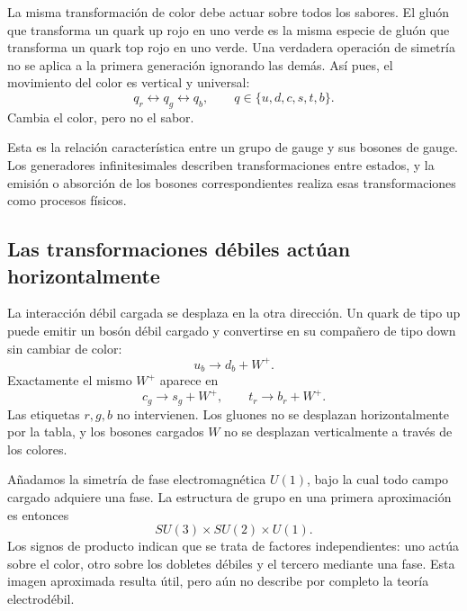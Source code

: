 La misma transformación de color debe actuar sobre todos los sabores. El gluón que transforma un quark up rojo en uno verde es la misma especie de gluón que transforma un quark top rojo en uno verde. Una verdadera operación de simetría no se aplica a la primera generación ignorando las demás. Así pues, el movimiento del color es vertical y universal:
\begin{equation}
  q_r\longleftrightarrow q_g\longleftrightarrow q_b,
  \qquad q\in\{u,d,c,s,t,b\}.
\end{equation}
Cambia el color, pero no el sabor.

Esta es la relación característica entre un grupo de gauge y sus bosones de gauge. Los generadores infinitesimales describen transformaciones entre estados, y la emisión o absorción de los bosones correspondientes realiza esas transformaciones como procesos físicos.

\subsection{Las transformaciones débiles actúan horizontalmente}

La interacción débil cargada se desplaza en la otra dirección. Un quark de tipo up puede emitir un bosón débil cargado y convertirse en su compañero de tipo down sin cambiar de color:
\begin{equation}
  u_b\longrightarrow d_b+W^+.
\end{equation}
Exactamente el mismo \(W^+\) aparece en
\begin{equation}
  c_g\longrightarrow s_g+W^+,
  \qquad
  t_r\longrightarrow b_r+W^+.
\end{equation}
Las etiquetas \(r,g,b\) no intervienen. Los gluones no se desplazan horizontalmente por la tabla, y los bosones cargados \(W\) no se desplazan verticalmente a través de los colores.

Añadamos la simetría de fase electromagnética \(U(1)\), bajo la cual todo campo cargado adquiere una fase. La estructura de grupo en una primera aproximación es entonces
\begin{equation}
  SU(3)\times SU(2)\times U(1).
\end{equation}
Los signos de producto indican que se trata de factores independientes: uno actúa sobre el color, otro sobre los dobletes débiles y el tercero mediante una fase. Esta imagen aproximada resulta útil, pero aún no describe por completo la teoría electrodébil.

